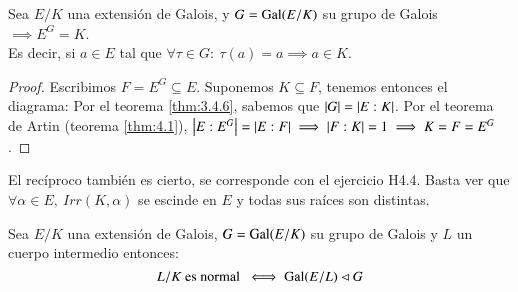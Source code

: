 \begin{thm}\label{thm:4.3}
    Sea $E/K$ una extensión de Galois, y $G = \mathrm{Gal}(E/K)$ su grupo de Galois $\implies E^G = K$.\\
    Es decir, si $a \in E$ tal que $\forall \tau \in G:\ \tau(a) = a \implies a \in K$.
\end{thm}
\begin{proof}
    Escribimos $F = E^G \subseteq E$. Suponemos $K \subseteq F$, tenemos entonces el diagrama:
    Por el teorema \ref{thm:3.4.6}, sabemos que $\left|G\right| = \left|E:K\right|$. Por el teorema de Artin (teorema \ref{thm:4.1}), $\left|E:E^G\right| = \left|E:F\right| \implies |F:K| = 1 \implies K = F = E^G$.
\end{proof}
\begin{obs}
    El recíproco también es cierto, se corresponde con el ejercicio H4.4. Basta ver que $\forall \alpha \in E,\ Irr(K, \alpha)$ se escinde en $E$ y todas sus raíces son distintas.
\end{obs}
\begin{cor}\label{cor:4.4}%
    Sea $E/K$ una extensión de Galois, $G = \mathrm{Gal}(E/K)$ su grupo de Galois y $L$ un cuerpo intermedio entonces:
    $$
        L/K \text{ es normal } \iff \mathrm{Gal}(E/L) \lhd G
    $$
\end{cor}

